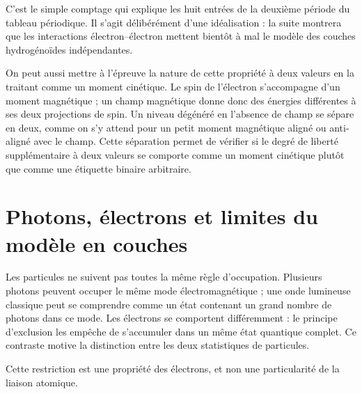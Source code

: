 C’est le simple comptage qui explique les huit entrées de la deuxième période du tableau périodique. Il s’agit délibérément d’une idéalisation : la suite montrera que les interactions électron--électron mettent bientôt à mal le modèle des couches hydrogénoïdes indépendantes.

On peut aussi mettre à l’épreuve la nature de cette propriété à deux valeurs en la traitant comme un moment cinétique. Le spin de l’électron s’accompagne d’un moment magnétique ; un champ magnétique donne donc des énergies différentes à ses deux projections de spin. Un niveau dégénéré en l’absence de champ se sépare en deux, comme on s’y attend pour un petit moment magnétique aligné ou anti-aligné avec le champ. Cette séparation permet de vérifier si le degré de liberté supplémentaire à deux valeurs se comporte comme un moment cinétique plutôt que comme une étiquette binaire arbitraire.

\section{Photons, électrons et limites du modèle en couches}

Les particules ne suivent pas toutes la même règle d’occupation. Plusieurs photons peuvent occuper le même mode électromagnétique ; une onde lumineuse classique peut se comprendre comme un état contenant un grand nombre de photons dans ce mode. Les électrons se comportent différemment : le principe d’exclusion les empêche de s’accumuler dans un même état quantique complet. Ce contraste motive la distinction entre les deux statistiques de particules.

\begin{classroomqa}
\end{classroomqa}

Cette restriction est une propriété des électrons, et non une particularité de la liaison atomique.

\begin{classroomqa}
\end{classroomqa}

